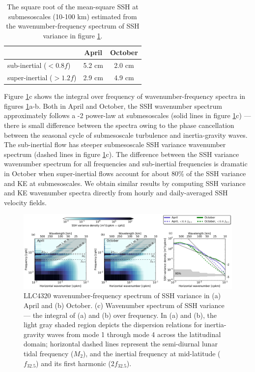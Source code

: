 \documentclass[grl]{agutex2015}
\begin{document}
\begin{article}
\begin{table}
\label{tab1}
\caption{The square root of the mean-square SSH at submesoscales (10-100 km)
        estimated from the wavenumber-frequency spectrum of SSH variance in figure \ref{fig4}.
        }
  \begin{center}
    \begin{tabular}{  l | c | c }
    \hline
    & April & October\\
    \hline
  sub-inertial ($<0.8f$)   & 5.2 cm & 2.0 cm  \\
  super-inertial ($>1.2f$) & 2.9 cm  & 4.9 cm\\
  \hline
    \end{tabular}
  \end{center}
\end{table}

Figure \ref{fig4}c shows the integral over frequency
of wavenumber-frequency spectra in figures \ref{fig4}a-b.
Both in April and October, the
SSH wavenumber spectrum approximately follows a -2 power-law at submesoscales
(solid lines in figure \ref{fig4}c)  --- there is
small difference between the spectra owing to the phase cancellation between the
seasonal cycle of submesoscale turbulence and inertia-gravity waves. The sub-inertial flow
has steeper submesoscale SSH variance wavenumber spectrum (dashed lines in figure \ref{fig4}c).
 The difference between the SSH variance wavenumber spectrum for all frequencies and
 sub-inertial frequencies is dramatic in October when super-inertial flows account for
 about 80\% of the SSH variance and KE at submesoscales. We obtain similar results by computing
SSH variance and KE wavenumber spectra directly from hourly and daily-averaged
SSH velocity fields.

\begin{figure}[ht]
  \begin{center}
    \includegraphics[width=.8\textwidth]{figs/fig4.pdf}
 \caption{\small LLC4320 wavenumber-frequency spectrum of SSH variance in (a) April and (b) October.
          (c) Wavenumber spectrum of SSH variance --- the integral of (a) and (b) over frequency.
          In (a) and (b), the light gray shaded region depicts the dispersion relations for inertia-gravity
          waves from mode 1 through mode 4 across the latitudinal domain; horizontal dashed lines represent the semi-diurnal
          lunar tidal frequency ($M_2$), and the inertial frequency at mid-latitude
          ($f_{32.5}$) and its first harmonic (2$f_{32.5}$). }
  \label{fig4}
 \end{center}
\end{figure}



\end{article}
\end{document}
